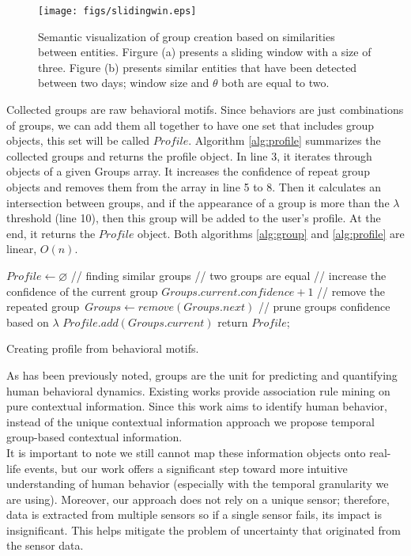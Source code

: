 \documentclass{sig-alternate}
\begin{document}
\begin{figure}[htb]
\texttt{[image: figs/slidingwin.eps]} 
\vspace{-0.2cm}
\caption{\small Semantic visualization of group creation based on similarities between entities. Firgure (a) presents a sliding window with a size of three. Figure (b) presents similar entities that have been detected between two days; window size and $\theta$ both are equal to two.}\label{fig:slwin}
\vspace{-0.1cm}
\end{figure}
Collected groups are raw behavioral motifs. Since behaviors are just combinations of groups, we can add them all together to have one set that includes group objects, this set will be called $Profile$. Algorithm \ref{alg:profile} summarizes the collected groups and returns the profile object. In line 3, it iterates through objects of a given Groups array. It increases the confidence of repeat group objects and removes them from the array in line 5 to 8. Then it calculates an intersection between groups, and if the appearance of a group is more than the $\lambda$ threshold (line 10), then this group will be added to the user's profile. At the end, it returns the $Profile$ object. Both algorithms \ref{alg:group} and \ref{alg:profile} are linear, $O(n)$.\\
\begin{algorithm2e}[htb] 
\scriptsize
 $Profile \gets \varnothing$\;
 // finding similar groups \;
  {
       // two groups are equal \;
		 {
			// increase the confidence of the current group
			$Groups.current.confidence + 1 $ \;
			// remove the repeated group\
			$Groups \gets remove(Groups.next)$ \;
		}
	}
  // prune groups confidence based on $\lambda$ \;
   {
  	 {
		$Profile.add(Groups.current)$ \;		  	 
  	 } 
  }
 return $Profile$;
\caption{\footnotesize Creating profile from behavioral motifs.}\label{alg:profile}
\end{algorithm2e}
\normalsize
As has been previously noted, groups are the unit for predicting and quantifying human behavioral dynamics. Existing works \cite{ace, mobileminer} provide association rule mining on pure contextual information. Since this work aims to identify human behavior, instead of the unique contextual information approach we propose temporal group-based contextual information.  \\
It is important to note we still cannot map these information objects onto real-life events, but our work offers a significant step toward more intuitive understanding of human behavior (especially with the temporal granularity we are using). Moreover, our approach does not rely on a unique sensor; therefore, data is extracted from multiple sensors so if a single sensor fails, its impact is insignificant. This helps mitigate the problem of uncertainty that originated from the sensor data.
\vspace{-0.2cm}
\end{document}
